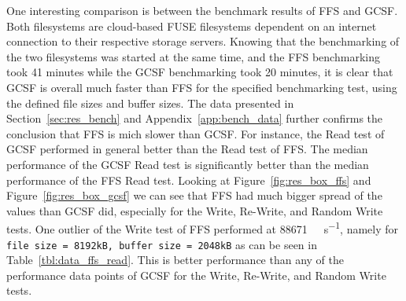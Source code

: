 One interesting comparison is between the benchmark results of \gls{FFS} and \gls{GCSF}. Both filesystems are \mbox{cloud-based} \gls{FUSE} filesystems dependent on an internet connection to their respective storage servers. Knowing that the benchmarking of the two filesystems was started at the same time, and the \gls{FFS} benchmarking took 41 minutes while the \gls{GCSF} benchmarking took 20 minutes, it is clear that \gls{GCSF} is overall much faster than \gls{FFS} for the specified benchmarking test, using the defined file sizes and buffer sizes. The data presented in Section~\ref{sec:res_bench} and Appendix~\ref{app:bench_data} further confirms the conclusion that \gls{FFS} is mich slower than \gls{GCSF}. For instance, the Read test of \gls{GCSF} performed in general better than the Read test of \gls{FFS}. The median performance of the \gls{GCSF} Read test is significantly better than the median performance of the \gls{FFS} Read test. Looking at Figure~\ref{fig:res_box_ffs} and Figure~\ref{fig:res_box_gcsf} we can see that \gls{FFS} had much bigger spread of the values than \gls{GCSF} did, especially for the Write, \mbox{Re-Write}, and Random Write tests. One outlier of the Write test of \gls{FFS} performed at \SI[per-mode = symbol]{88671}{\kilo\byte\per\second}, namely for \texttt{file size = 8192kB, buffer size = 2048kB} as can be seen in Table~\ref{tbl:data_ffs_read}. This is better performance than any of the performance data points of \gls{GCSF} for the Write, \mbox{Re-Write}, and Random Write tests.

